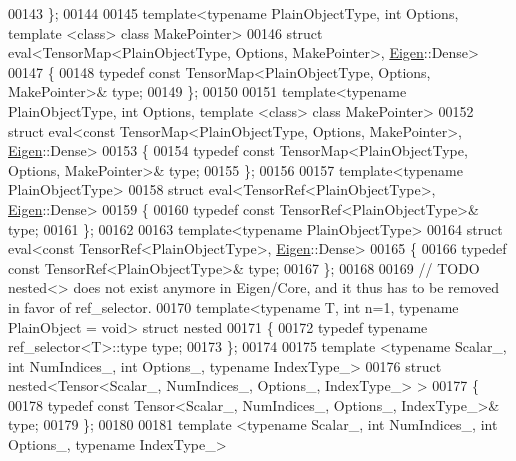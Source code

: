 \begin{DoxyCode}
00143 \};
00144 
00145 \textcolor{keyword}{template}<\textcolor{keyword}{typename} PlainObjectType, \textcolor{keywordtype}{int} Options, \textcolor{keyword}{template} <\textcolor{keyword}{class}> \textcolor{keyword}{class }MakePointer>
00146 \textcolor{keyword}{struct }eval<TensorMap<PlainObjectType, Options, MakePointer>, \hyperlink{namespace_eigen}{Eigen}::Dense>
00147 \{
00148   \textcolor{keyword}{typedef} \textcolor{keyword}{const} TensorMap<PlainObjectType, Options, MakePointer>& type;
00149 \};
00150 
00151 \textcolor{keyword}{template}<\textcolor{keyword}{typename} PlainObjectType, \textcolor{keywordtype}{int} Options, \textcolor{keyword}{template} <\textcolor{keyword}{class}> \textcolor{keyword}{class }MakePointer>
00152 \textcolor{keyword}{struct }eval<const TensorMap<PlainObjectType, Options, MakePointer>, \hyperlink{namespace_eigen}{Eigen}::Dense>
00153 \{
00154   \textcolor{keyword}{typedef} \textcolor{keyword}{const} TensorMap<PlainObjectType, Options, MakePointer>& type;
00155 \};
00156 
00157 \textcolor{keyword}{template}<\textcolor{keyword}{typename} PlainObjectType>
00158 \textcolor{keyword}{struct }eval<TensorRef<PlainObjectType>, \hyperlink{namespace_eigen}{Eigen}::Dense>
00159 \{
00160   \textcolor{keyword}{typedef} \textcolor{keyword}{const} TensorRef<PlainObjectType>& type;
00161 \};
00162 
00163 \textcolor{keyword}{template}<\textcolor{keyword}{typename} PlainObjectType>
00164 \textcolor{keyword}{struct }eval<const TensorRef<PlainObjectType>, \hyperlink{namespace_eigen}{Eigen}::Dense>
00165 \{
00166   \textcolor{keyword}{typedef} \textcolor{keyword}{const} TensorRef<PlainObjectType>& type;
00167 \};
00168 
00169 \textcolor{comment}{// TODO nested<> does not exist anymore in Eigen/Core, and it thus has to be removed in favor of
       ref\_selector.}
00170 \textcolor{keyword}{template}<\textcolor{keyword}{typename} T, \textcolor{keywordtype}{int} n=1, \textcolor{keyword}{typename} PlainObject = \textcolor{keywordtype}{void}> \textcolor{keyword}{struct }nested
00171 \{
00172   \textcolor{keyword}{typedef} \textcolor{keyword}{typename} ref\_selector<T>::type type;
00173 \};
00174 
00175 \textcolor{keyword}{template} <\textcolor{keyword}{typename} Scalar\_, \textcolor{keywordtype}{int} NumIndices\_, \textcolor{keywordtype}{int} Options\_, \textcolor{keyword}{typename} IndexType\_>
00176 \textcolor{keyword}{struct }nested<Tensor<Scalar\_, NumIndices\_, Options\_, IndexType\_> >
00177 \{
00178   \textcolor{keyword}{typedef} \textcolor{keyword}{const} Tensor<Scalar\_, NumIndices\_, Options\_, IndexType\_>& type;
00179 \};
00180 
00181 \textcolor{keyword}{template} <\textcolor{keyword}{typename} Scalar\_, \textcolor{keywordtype}{int} NumIndices\_, \textcolor{keywordtype}{int} Options\_, \textcolor{keyword}{typename} IndexType\_>

\end{DoxyCode}
